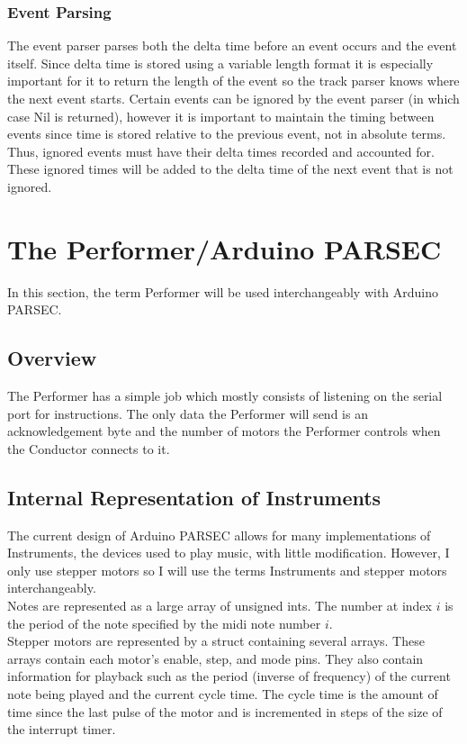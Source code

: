 \documentclass{article}
\begin{document}
\subsubsection{Event Parsing}
\noindent The event parser parses both the delta time before an event occurs and the event itself. Since delta time is stored using a variable length format it is especially important for it to return the length of the event so the track parser knows where the next event starts. Certain events can be ignored by the event parser (in which case Nil is returned), however it is important to maintain the timing between events since time is stored relative to the previous event, not in absolute terms. Thus, ignored events must have their delta times recorded and accounted for. These ignored times will be added to the delta time of the next event that is not ignored.


\section{The Performer/Arduino PARSEC}
\noindent In this section, the term Performer will be used interchangeably with Arduino PARSEC.

\subsection{Overview}
\noindent The Performer has a simple job which mostly consists of listening on the serial port for instructions. The only data the Performer will send is an acknowledgement byte and the number of motors the Performer controls when the Conductor connects to it.

\subsection{Internal Representation of Instruments}
\noindent The current design of Arduino PARSEC allows for many implementations of Instruments, the devices used to play music, with little modification. However, I only use stepper motors so I will use the terms Instruments and stepper motors interchangeably.\\

\noindent Notes are represented as a large array of unsigned ints. The number at index $i$ is the period of the note specified by the midi note number $i$.\\

\noindent Stepper motors are represented by a struct containing several arrays. These arrays contain each motor's enable, step, and mode pins. They also contain information for playback such as the period (inverse of frequency) of the current note being played and the current cycle time. The cycle time is the amount of time since the last pulse of the motor and is incremented in steps of the size of the interrupt timer.
\end{document}
